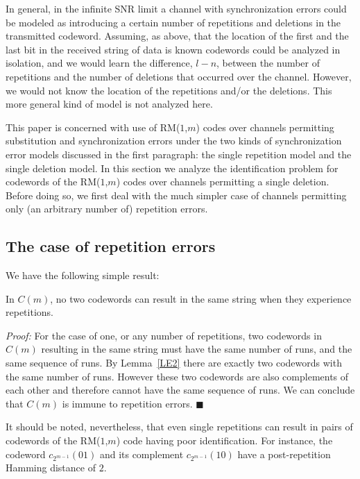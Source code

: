 In general, in the infinite SNR limit a channel with
synchronization errors could be modeled as introducing a certain
number of repetitions and deletions in the transmitted codeword.
Assuming, as above, that the location of the first and the last
bit in the received string of data is known codewords could be
analyzed in isolation, and we would learn the difference, $l -n$,
between the number of repetitions and the number of deletions that
occurred over the channel. However, we would not know the location
of the repetitions and/or the deletions. This more general kind of
model is not analyzed here.

This paper is concerned with use of RM($1$,$m$)
codes over channels permitting substitution and
synchronization errors under the two kinds of
synchronization error models discussed in the
first paragraph: the single repetition model and
the single deletion model.
In this section
we analyze the identification problem for codewords of the
RM($1$,$m$) codes over channels permitting a single deletion.
Before doing so, we first deal with the much simpler case of
channels permitting only (an arbitrary
number of) repetition errors.

\subsection{The case of repetition errors}

We have the following simple result:

\begin{theorem}\label{THE1} In $C(m)$, no two codewords can result
in the same string when they experience repetitions.
\end{theorem}

\noindent \textit{Proof:} For the case of one, or any number of
repetitions, two codewords in $C(m)$ resulting in the same string
must have the same number of runs, and the same sequence of runs. By
Lemma~\ref{LE2} there are exactly two codewords with the same number
of runs. However these two codewords are also complements of each
other and therefore cannot have the same sequence of runs. We can
conclude that $C(m)$ is immune to repetition errors. \hfill
$\blacksquare$

It should be noted, nevertheless, that even
single repetitions can result in pairs of codewords
of the RM($1$,$m$) code having poor
identification. For instance, the codeword
$c_{2^{m-1}}(01)$ and its complement
$c_{2^{m-1}}(10)$ have a
post-repetition Hamming distance of $2$.

